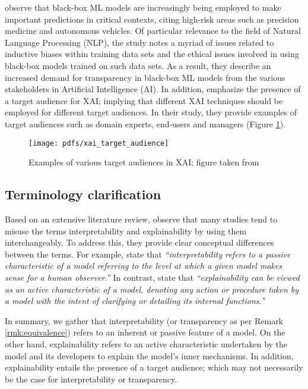 \citet{arrieta2020explainable} observe that black-box ML models are increasingly being employed to make important predictions in critical contexts, citing high-risk areas such as precision medicine and autonomous vehicles. Of particular relevance to the field of Natural Language Processing (NLP), the study notes a myriad of issues related to inductive biases within training data sets and the ethical issues involved in using black-box models trained on such data sets. As a result, they describe an increased demand for transparency in black-box ML models from the various stakeholders in Artificial Intelligence (AI). In addition, \citet{arrieta2020explainable} emphasize the presence of a target audience for XAI; implying that different XAI techniques should be employed for different target audiences. In their study, they provide examples of target audiences such as domain experts, end-users and managers (Figure \ref{fig:xai-target-audience}).

\begin{figure}[t]
  \centering
  \texttt{[image: pdfs/xai\_target\_audience]}
  \caption{Examples of various target audiences in XAI; figure taken from \citet{arrieta2020explainable}}
  \label{fig:xai-target-audience}
\end{figure}

\subsection{Terminology clarification}

\label{section:xai-terminology}

Based on an extensive literature review, \citet{arrieta2020explainable} observe that many studies tend to misuse the terms interpretability and explainability by using them interchangeably. To address this, they provide clear conceptual differences between the terms. For example, \citet[Section 2.1, Page 3]{arrieta2020explainable} state that \textit{``interpretability refers to a passive characteristic of a model referring to the level at which a given model makes sense for a human observer.''} In contrast, \citet[Section 2.1, Page 3]{arrieta2020explainable} state that \textit{``explainability can be viewed as an active characteristic of a model, denoting any action or procedure taken by a model with the intent of clarifying or detailing its internal functions.''}

In summary, we gather that interpretability (or transparency as per Remark \ref{rmk:equivalence}) refers to an inherent or passive feature of a model. On the other hand, explainability refers to an active characteristic undertaken by the model and its developers to explain the model's inner mechanisms. In addition, explainability entails the presence of a target audience; which may not necessarily be the case for interpretability or transparency.

